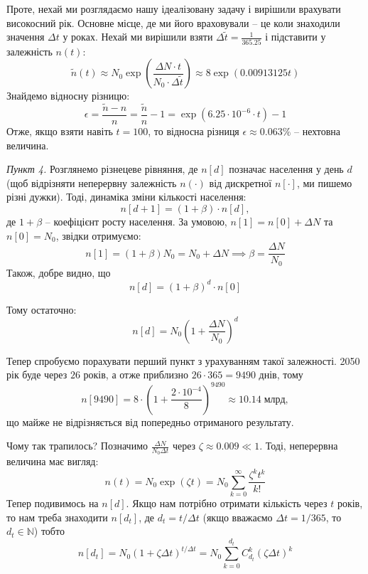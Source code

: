 \documentclass[oneside,solution]{tmpl}
\begin{document}
Проте, нехай ми розглядаємо нашу ідеалізовану задачу і вирішили врахувати високосний рік. Основне місце, де ми його враховували -- це коли знаходили значення $\Delta t$ у роках. Нехай ми вирішили взяти $\Delta \widetilde{t} = \frac{1}{365.25}$ і підставити у залежність $n(t)$:
\begin{equation}
    \widetilde{n}(t) \approx N_0 \exp\left(\frac{\Delta N \cdot t}{N_0 \cdot \Delta\widetilde{t}}\right) \approx 8 \exp (0.00913125 t)
\end{equation}
Знайдемо відносну різницю:
\begin{equation}
    \epsilon = \frac{\widetilde{n} - n}{n} = \frac{\widetilde{n}}{n}-1 = \exp(6.25 \cdot 10^{-6} \cdot t) - 1
\end{equation}
Отже, якщо взяти навіть $t=100$, то відносна різниця $\epsilon \approx 0.063 \%$ -- нехтовна величина. 

\textit{Пункт 4.} Розглянемо різнецеве рівняння, де $n[d]$ позначає населення у день $d$ (щоб відрізняти неперервну залежність $n(\cdot)$ від дискретної $n[\cdot]$, ми пишемо різні дужки). Тоді, динаміка зміни кількості населення:
\begin{equation}
    n[d+1] = (1+\beta)\cdot n[d],
\end{equation}
де $1+\beta$ -- коефіцієнт росту населення. За умовою, $n[1] = n[0] + \Delta N$ та $n[0]=N_0$, звідки отримуємо:
\begin{equation}
    n[1] = (1 + \beta)N_0 = N_0 + \Delta N \implies \beta = \frac{\Delta N}{N_0}
\end{equation}
Також, добре видно, що
\begin{equation}
    n[d] = (1+\beta)^d \cdot n[0]
\end{equation}

Тому остаточно:
\begin{equation}
    n[d] = N_0\left(1+\frac{\Delta N}{N_0}\right)^d 
\end{equation}

Тепер спробуємо порахувати перший пункт з урахуванням такої залежності. 2050 рік буде через $26$ років, а отже приблизно $26\cdot 365 = 9490$ днів, тому
\begin{equation}
    n[9490] = 8 \cdot \left(1+\frac{2 \cdot 10^{-4}}{8}\right)^{9490} \approx 10.14 \; \text{млрд},
\end{equation}
що майже не відрізняється від попередньо отриманого результату. 

Чому так трапилось? Позначимо $\frac{\Delta N}{N_0 \Delta t}$ через $\zeta \approx 0.009 \ll 1$. Тоді, неперервна величина має вигляд:
\begin{equation}
    n(t) = N_0 \exp (\zeta t) = N_0 \sum_{k=0}^{\infty} \frac{\zeta^k t^k}{k!}
\end{equation}
Тепер подивимось на $n[d]$. Якщо нам потрібно отримати кількість через $t$ років, то нам треба знаходити $n[d_t]$, де $d_t=t/\Delta t$ (якщо вважаємо $\Delta t = 1/365$, то $d_t \in \mathbb{N}$) тобто 
\begin{equation}
    n[d_t] = N_0\left(1 + \zeta\Delta t\right)^{t/\Delta t} = N_0 \sum_{k=0}^{d_t} C_{d_t}^k (\zeta \Delta t)^k
\end{equation}
\end{document}
